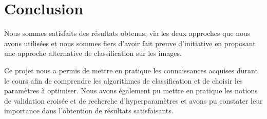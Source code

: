\documentclass{article}
\begin{document}
\newpage
\section{Conclusion}
Nous sommes satisfaits des résultats obtenus, via les deux approches que nous avons
utilisées et nous sommes fiers d'avoir fait preuve d'initiative en proposant
une approche alternative de classification sur les images.

Ce projet nous a permis de mettre en pratique les connaissances acquises
durant le cours afin de comprendre les algorithmes de classification et
de choisir les paramètres à optimiser. Nous avons également pu mettre
en pratique les notions de validation croisée et de recherche d'hyperparamètres
et avons pu constater leur importance dans l'obtention de résultats satisfaisants.

\newpage


\end{document}
